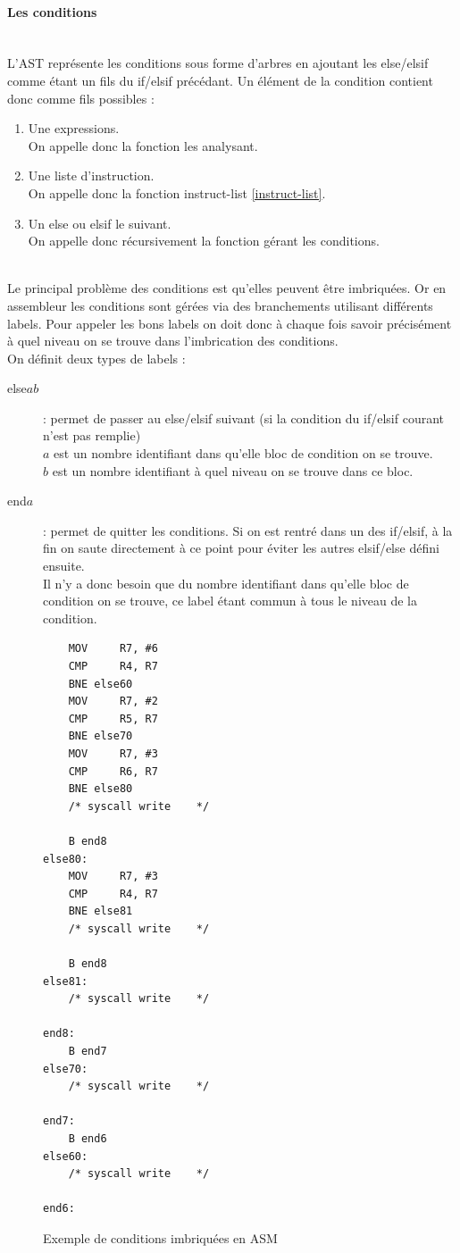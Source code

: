 \documentclass[a4paper,10pt]{article}
\begin{document}
		\paragraph{Les conditions}~\\
			L'AST représente les conditions sous forme d'arbres en ajoutant les else/elsif comme étant un fils du if/elsif précédant. Un élément de la condition contient donc comme fils possibles : 
			\begin{enumerate}
				\item Une expressions.\\
					On appelle donc la fonction les analysant.
				\item Une liste d'instruction.\\
					On appelle donc la fonction instruct-list \ref{instruct-list}.
				\item Un else ou elsif le suivant.\\
					On appelle donc récursivement la fonction gérant les conditions.
			\end{enumerate}
			~\\
			Le principal problème des conditions est qu'elles peuvent être imbriquées. Or en assembleur les conditions sont gérées via des branchements utilisant différents labels. Pour appeler les bons labels on doit donc à chaque fois savoir précisément à quel niveau on se trouve dans l'imbrication des conditions.\\
			On définit deux types de labels :\begin{description}
				\item[else$ab$] : permet de passer au else/elsif suivant (si la condition du if/elsif courant n'est pas remplie)\\
				$a$ est un nombre identifiant dans qu'elle bloc de condition on se trouve.\\
				$b$ est un nombre identifiant à quel niveau on se trouve dans ce bloc.
				\item[end$a$] : permet de quitter les conditions. Si on est rentré dans un des if/elsif, à la fin on saute directement à ce point pour éviter les autres elsif/else défini ensuite.\\
				Il n'y a donc besoin que du nombre identifiant dans qu'elle bloc de condition on se trouve, ce label étant commun à tous le niveau de la condition.
			\end{description}
\begin{figure}[H]
\begin{lstlisting}
	MOV 	R7, #6
	CMP		R4, R7
	BNE else60
	MOV 	R7, #2
	CMP		R5, R7
	BNE else70
	MOV 	R7, #3
	CMP		R6, R7
	BNE else80
	/* syscall write	*/ 

	B end8
else80: 
	MOV 	R7, #3
	CMP		R4, R7
	BNE else81
	/* syscall write	*/ 

	B end8
else81: 
	/* syscall write	*/ 

end8:
	B end7
else70: 
	/* syscall write	*/ 

end7:
	B end6
else60: 
	/* syscall write	*/ 

end6:
\end{lstlisting}
\fontfamily{}
\caption{Exemple de conditions imbriquées en ASM}
\label{lst:ExCond}
\end{figure}
\end{document}
